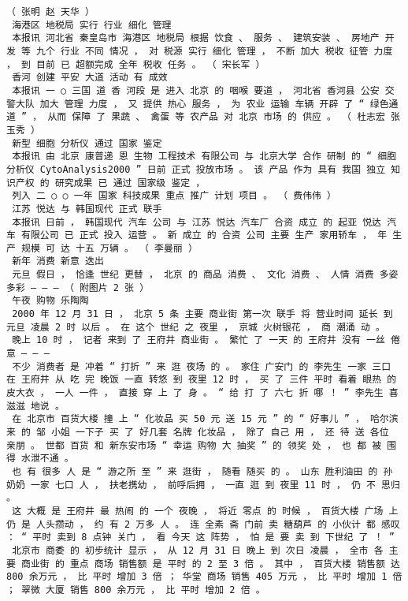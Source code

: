 \documentclass{article}
\begin{document}
\begin{Verbatim}[commandchars=\\\{\}]
 （ 张明 赵 天华 ） 
 海港区 地税局 实行 行业 细化 管理 
 本报讯 河北省 秦皇岛市 海港区 地税局 根据 饮食 、 服务 、 建筑安装 、 房地产 开发 等 九个 行业 不同 情况 ， 对 税源 实行 细化 管理 ， 不断 加大 税收 征管 力度 ， 到 目前 已 超额完成 全年 税收 任务 。 （ 宋长军 ） 
 香河 创建 平安 大道 活动 有 成效 
 本报讯 一 ○ 三国 道 香 河段 是 进入 北京 的 咽喉 要道 ， 河北省 香河县 公安 交警大队 加大 管理 力度 ， 又 提供 热心 服务 ， 为 农业 运输 车辆 开辟 了 “ 绿色通道 ” ， 从而 保障 了 果蔬 、 禽蛋 等 农产品 对 北京 市场 的 供应 。 （ 杜志宏 张玉秀 ） 
 新型 细胞 分析仪 通过 国家 鉴定 
 本报讯 由 北京 康普递 恩 生物 工程技术 有限公司 与 北京大学 合作 研制 的 “ 细胞 分析仪 CytoAnalysis2000 ” 日前 正式 投放市场 。 该 产品 作为 具有 我国 独立 知识产权 的 研究成果 已 通过 国家级 鉴定 ， 
 列入 二 ○ ○ 一年 国家 科技成果 重点 推广 计划 项目 。 （ 费伟伟 ） 
 江苏 悦达 与 韩国现代 正式 联手 
 本报讯 日前 ， 韩国现代 汽车 公司 与 江苏 悦达 汽车厂 合资 成立 的 起亚 悦达 汽车 有限公司 已 正式 投入 运营 。 新 成立 的 合资 公司 主要 生产 家用轿车 ， 年 生产 规模 可 达 十五 万辆 。 （ 李曼丽 ） 
 新年 消费 新意 迭出 
 元旦 假日 ， 恰逢 世纪 更替 ， 北京 的 商品 消费 、 文化 消费 、 人情 消费 多姿多彩 — — — （ 附图片 2 张 ） 
 午夜 购物 乐陶陶 
 2000 年 12 月 31 日 ， 北京 5 条 主要 商业街 第一次 联手 将 营业时间 延长 到 元旦 凌晨 2 时 以后 。 在 这个 世纪 之 夜里 ， 京城 火树银花 ， 商 潮涌 动 。 
 晚上 10 时 ， 记者 来到 了 王府井 商业街 。 繁忙 了 一天 的 王府井 没有 一丝 倦意 — — — 
 不少 消费者 是 冲着 “ 打折 ” 来 逛 夜场 的 。 家住 广安门 的 李先生 一家 三口 在 王府井 从 吃 完 晚饭 一直 转悠 到 夜里 12 时 ， 买 了 三件 平时 看着 眼热 的 皮大衣 ， 一人 一件 ， 直接 穿 上 了 身 。 “ 给 打 了 六七 折 哪 ！ ” 李先生 喜滋滋 地说 。 
 在 北京市 百货大楼 撞 上 “ 化妆品 买 50 元 送 15 元 ” 的 “ 好事儿 ” ， 哈尔滨 来 的 邹 小姐 一下子 买 了 好几套 名牌 化妆品 ， 除了 自己 用 ， 还 待 送 各位 亲朋 。 世都 百货 和 新东安市场 “ 幸运 购物 大 抽奖 ” 的 领奖 处 ， 也 都 被 围得 水泄不通 。 
 也 有 很多 人 是 “ 游之所 至 ” 来 逛街 ， 随看 随买 的 。 山东 胜利油田 的 孙 奶奶 一家 七口 人 ， 扶老携幼 ， 前呼后拥 ， 一直 逛 到 夜里 11 时 ， 仍 不 思归 。 
 这 大概 是 王府井 最 热闹 的 一个 夜晚 ， 将近 零点 的 时候 ， 百货大楼 广场 上 仍 是 人头攒动 ， 约 有 2 万多 人 。 连 全素 斋 门前 卖 糖葫芦 的 小伙计 都 感叹 ： “ 平时 卖到 8 点钟 关门 ， 看 今天 这 阵势 ， 怕 是 要 卖 到 下世纪 了 ！ ” 
 北京市 商委 的 初步统计 显示 ， 从 12 月 31 日 晚上 到 次日 凌晨 ， 全市 各 主要 商业街 的 重点 商场 销售额 是 平时 的 2 至 3 倍 。 其中 ， 百货大楼 销售额 达 800 余万元 ， 比 平时 增加 3 倍 ； 华堂 商场 销售 405 万元 ， 比 平时 增加 1 倍 ； 翠微 大厦 销售 800 余万元 ， 比 平时 增加 2 倍 。 

\end{Verbatim}
\end{document}
